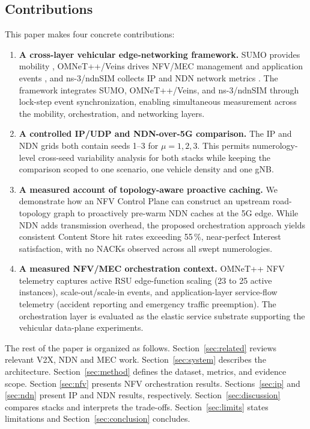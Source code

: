 \documentclass[journal]{IEEEtran}
\begin{document}
\subsection{Contributions}

This paper makes four concrete contributions:
\begin{enumerate}
  \item \textbf{A cross-layer vehicular edge-networking framework.} SUMO provides mobility \cite{ref:sumo}, OMNeT++/Veins drives NFV/MEC management and application events \cite{ref:veins}, and ns-3/ndnSIM collects IP and NDN network metrics \cite{ref:ndnsim,ref:ns3-nr}. The framework integrates SUMO, OMNeT++/Veins, and ns-3/ndnSIM through lock-step event synchronization, enabling simultaneous measurement across the mobility, orchestration, and networking layers.

  \item \textbf{A controlled IP/UDP and NDN-over-5G comparison.} The IP and NDN grids both contain seeds 1--3 for $\mu=1,2,3$. This permits numerology-level cross-seed variability analysis for both stacks while keeping the comparison scoped to one scenario, one vehicle density and one gNB.

  \item \textbf{A measured account of topology-aware proactive caching.} We demonstrate how an NFV Control Plane can construct an upstream road-topology graph to proactively pre-warm NDN caches at the 5G edge. While NDN adds transmission overhead, the proposed orchestration approach yields consistent Content Store hit rates exceeding 55\,\%, near-perfect Interest satisfaction, with no NACKs observed across all swept numerologies.

  \item \textbf{A measured NFV/MEC orchestration context.} OMNeT++ NFV telemetry captures active RSU edge-function scaling (23 to 25 active instances), scale-out/scale-in events, and application-layer service-flow telemetry (accident reporting and emergency traffic preemption). The orchestration layer is evaluated as the elastic service substrate supporting the vehicular data-plane experiments.
\end{enumerate}

The rest of the paper is organized as follows. Section~\ref{sec:related} reviews relevant V2X, NDN and MEC work. Section~\ref{sec:system} describes the architecture. Section~\ref{sec:method} defines the dataset, metrics, and evidence scope. Section \ref{sec:nfv} presents NFV orchestration results. Sections~\ref{sec:ip} and \ref{sec:ndn} present IP and NDN results, respectively. Section~\ref{sec:discussion} compares stacks and interprets the trade-offs. Section~\ref{sec:limits} states limitations and Section~\ref{sec:conclusion} concludes.
\end{document}
